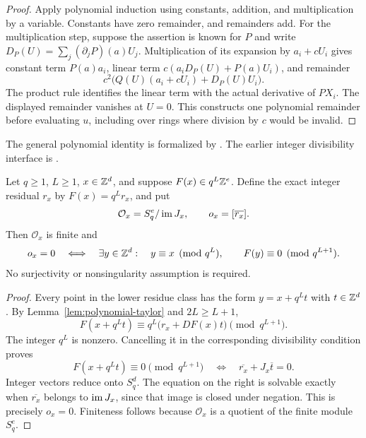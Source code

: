 \begin{proof}
Apply polynomial induction using constants, addition, and multiplication by a
variable. Constants have zero remainder, and remainders add. For the
multiplication step, suppose the assertion is known for $P$ and write
$D_P(U)=\sum_j(\partial_jP)(a)U_j$. Multiplication of its expansion by
$a_i+cU_i$ gives constant term $P(a)a_i$, linear term
$c(a_iD_P(U)+P(a)U_i)$, and remainder
\[
 c^2\bigl(Q(U)(a_i+cU_i)+D_P(U)U_i\bigr).
\]
The product rule identifies the linear term with the actual derivative of
$PX_i$. The displayed remainder vanishes at $U=0$. This constructs one
polynomial remainder before evaluating $u$, including over rings where
division by $c$ would be invalid.
\end{proof}

The general polynomial identity is formalized by
.
The earlier integer divisibility interface is
.

\begin{theorem}\label{thm:finite-polynomial-obstruction}
Let $q\ge1$, $L\ge1$, $x\in\mathbb Z^d$, and suppose
$F(x)\in q^L\mathbb Z^e$. Define the exact integer residual $r_x$ by
$F(x)=q^Lr_x$, and put
\[
 \mathcal O_x=S_q^e/\operatorname{im} J_x,\qquad o_x=[\overline{r_x}].
\]
Then $\mathcal O_x$ is finite and
\begin{equation}\label{eq:finite-obstruction}
 o_x=0\quad\Longleftrightarrow\quad
 \exists y\in\mathbb Z^d:\quad
 y\equiv x\pmod{q^L},\qquad F(y)\equiv0\pmod{q^{L+1}}.
\end{equation}
No surjectivity or nonsingularity assumption is required.
\end{theorem}

\begin{proof}
Every point in the lower residue class has the form $y=x+q^Lt$ with
$t\in\mathbb Z^d$. By Lemma~\ref{lem:polynomial-taylor} and $2L\ge L+1$,
\[
 F(x+q^Lt)\equiv q^L\bigl(r_x+DF(x)t\bigr)\pmod{q^{L+1}}.
\]
The integer $q^L$ is nonzero. Cancelling it in the corresponding divisibility
condition proves
\begin{equation}\label{eq:digit-correction}
 F(x+q^Lt)\equiv0\pmod{q^{L+1}}
 \quad\Longleftrightarrow\quad
 \overline{r_x}+J_x\overline t=0.
\end{equation}
Integer vectors reduce onto $S_q^d$. The equation on the right is solvable
exactly when $\overline{r_x}$ belongs to $\operatorname{im} J_x$, since that image is
closed under negation. This is precisely $o_x=0$. Finiteness follows because
$\mathcal O_x$ is a quotient of the finite module $S_q^e$.
\end{proof}

